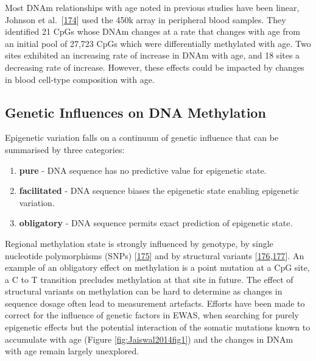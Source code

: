 \documentclass[
]{book}
\begin{document}
Most DNAm relationships with age noted in previous studies have been linear, Johnson et al.~{[}\protect\hyperlink{ref-Johnson2017}{174}{]} used the 450k array in peripheral blood samples.
They identified 21 CpGs whose DNAm changes at a rate that changes with age from an initial pool of 27,723 CpGs which were differentially methylated with age.
Two sites exhibited an increasing rate of increase in DNAm with age, and 18 sites a decreasing rate of increase.
However, these effects could be impacted by changes in blood cell-type composition with age.

\hypertarget{genetic-influences-on-dna-methylation}{%
\subsection{Genetic Influences on DNA Methylation}\label{genetic-influences-on-dna-methylation}}

Epigenetic variation falls on a continuum of genetic influence that can be summarised by three categories:

\begin{enumerate}
\def\labelenumi{\arabic{enumi}.}
\item
  \textbf{pure} - DNA sequence has no predictive value for epigenetic state.
\item
  \textbf{facilitated} - DNA sequence biases the epigenetic state enabling epigenetic variation.
\item
  \textbf{obligatory} - DNA sequence permits exact prediction of epigenetic state.
\end{enumerate}

Regional methylation state is strongly influenced by genotype, by single nucleotide polymorphisms (SNPs) {[}\protect\hyperlink{ref-Smith2014a}{175}{]} and by structural variants {[}\protect\hyperlink{ref-Kuehnen2012}{176},\protect\hyperlink{ref-Gymrek2015}{177}{]}.
An example of an obligatory effect on methylation is a point mutation at a CpG site, a C to T transition precludes methylation at that site in future.
The effect of structural variants on methylation can be hard to determine as changes in sequence dosage often lead to measurement artefacts.
Efforts have been made to correct for the influence of genetic factors in EWAS, when searching for purely epigenetic effects but the potential interaction of the somatic mutations known to accumulate with age (Figure \ref{fig:Jaiswal2014fig1}) and the changes in DNAm with age remain largely unexplored.
\end{document}
